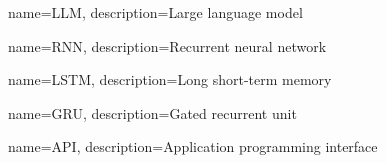 {
    name={LLM},
    description={Large language model}
}

{
    name={RNN},
    description={Recurrent neural network}
}

{
    name={LSTM},
    description={Long short-term memory}
}

{
    name={GRU},
    description={Gated recurrent unit}
}

{
    name={API},
    description={Application programming interface}
}


\glsaddall

